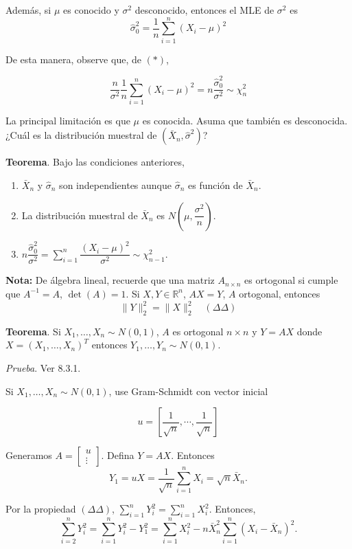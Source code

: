 \documentclass[
  12pt,
]{book}
\begin{document}
Además, si \(\mu\) es conocido y \(\sigma^2\) desconocido, entonces el MLE de \(\sigma ^{2}\) es
\[\hat\sigma_0^2=\dfrac{1}n \sum_{i=1}^n(X_i-\mu)^2\]

De esta manera, observe que, de \((*)\),

\[\dfrac{n}{\sigma^2} \dfrac{1}n \sum_{i=1}^n(X_i-\mu)^2 = n\dfrac{\hat \sigma_{0}^2}{\sigma^2} \sim \chi^2_n \]

La principal limitación es que \(\mu\) es conocida. Asuma que también es
desconocida. ¿Cuál es la distribución muestral de \((\bar X_n,\hat\sigma^2)\)?

\textbf{Teorema}. Bajo las condiciones anteriores,

\begin{enumerate}
\def\labelenumi{\arabic{enumi}.}
\item
  \(\bar X_n\) y \(\hat \sigma_n\) son independientes aunque \(\hat \sigma_n\) es función de
  \(\bar X_n\).
\item
  La distribución muestral de \(\bar X_n\) es \(N\left(\mu,\dfrac{\sigma^2}{n}\right)\).
\item
  \(n\dfrac{\hat \sigma_{0}^2}{\sigma^2} =\sum_{i=1}^n \dfrac{(X_i-\mu)^2}{\sigma^2} \sim \chi^2_{n-1}\).
\end{enumerate}

\textbf{Nota:} De álgebra lineal, recuerde que una matriz \(A_{n\times n}\) es ortogonal si
cumple que \(A^{-1} = A\), \(\det(A) = 1\). Si \(X, Y\in \mathbb R ^{n}\), \(AX =Y\), \(A\)
ortogonal, entonces \[ \|Y\|_2^2 = \|X\|_2^2 \quad (\Delta\Delta)\]

\textbf{Teorema}. Si \(X_1,\dots,X_n \sim N(0,1)\), \(A\) es ortogonal \(n\times n\) y \(Y=AX\) donde
\(X = (X_1,\dots,X_n)^T\) entonces \(Y_1,\dots,Y_n \sim N(0,1)\).

\emph{Prueba}. Ver 8.3.1.

Si \(X_1,\dots,X_n \sim N(0,1)\), use Gram-Schmidt con vector inicial

\begin{equation*}
u = \left[ \frac{1}{\sqrt{n}}, \cdots, \frac{1}{\sqrt{n}}\right]
\end{equation*}

Generamos \(A = \begin{bmatrix}u\\\vdots\end{bmatrix}\). Defina \(Y =AX\). Entonces \[ Y_1 = uX = \dfrac 1{\sqrt{n}}\sum_{i=1}^n X_i = \sqrt{n} \bar
X_n.\]

Por la propiedad \((\Delta \Delta)\), \(\displaystyle\sum_{i=1}^n Y_i^2 = \displaystyle\sum_{i=1}^n X_i^2\). Entonces,
\[ \sum_{i=2}^nY_i^2 = \sum_{i=1}^nY_i^2 - Y_1^2 = \sum_{i=1}^nX_i^2-n\bar X_n^2\sum_{i=1}^n(X_i-\bar X_n)^2. \]
\end{document}
